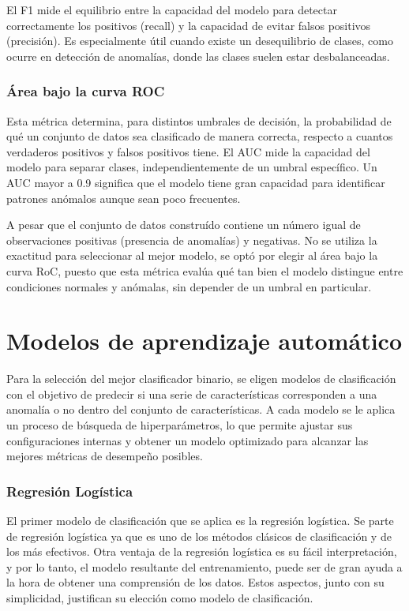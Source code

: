 \documentclass[11pt,a4paper,spanish]{book}
\numberwithin{equation}{chapter}
\numberwithin{figure}{chapter}
\begin{document}
El F1 mide el equilibrio entre la capacidad del modelo para detectar correctamente los positivos (recall) y la capacidad de evitar falsos positivos (precisión). Es especialmente útil cuando existe un desequilibrio de clases, como ocurre en detección de anomalías, donde las clases suelen estar desbalanceadas. 


\subsubsection{Área bajo la curva ROC}

Esta métrica determina, para distintos umbrales de decisión, la probabilidad de qué un conjunto de datos sea clasificado de manera correcta, respecto a cuantos verdaderos positivos y falsos positivos tiene. El AUC mide la capacidad del modelo para separar clases, independientemente de un umbral específico. Un AUC mayor a 0.9 significa que el modelo tiene gran capacidad para identificar patrones anómalos aunque sean poco frecuentes.

A pesar que el conjunto de datos construído contiene un número igual de observaciones positivas (presencia de anomalías) y negativas. No se utiliza la exactitud para seleccionar al mejor modelo, se optó por elegir al área bajo la curva RoC, puesto que esta métrica evalúa qué tan bien el modelo distingue entre condiciones normales y anómalas, sin depender de un umbral en particular. 


\section{Modelos de aprendizaje automático}

Para la selección del mejor clasificador binario, se eligen modelos de clasificación con el objetivo de predecir si una serie de características corresponden a una anomalía o no dentro del conjunto de características. A cada modelo se le aplica un proceso de búsqueda de hiperparámetros, lo que permite ajustar sus configuraciones internas y obtener un modelo optimizado para alcanzar las mejores métricas de desempeño posibles. 


\subsubsection{Regresión Logística}

El primer modelo de clasificación que se aplica es la regresión logística. Se parte de  regresión logística ya que es uno de los métodos clásicos de clasificación y de los  más efectivos. Otra ventaja de la regresión logística es su fácil interpretación, y por lo tanto, el modelo resultante del entrenamiento, puede ser de gran ayuda a la hora de obtener una comprensión de los datos. Estos aspectos, junto con su simplicidad,  justifican su elección como modelo de clasificación.
\end{document}
